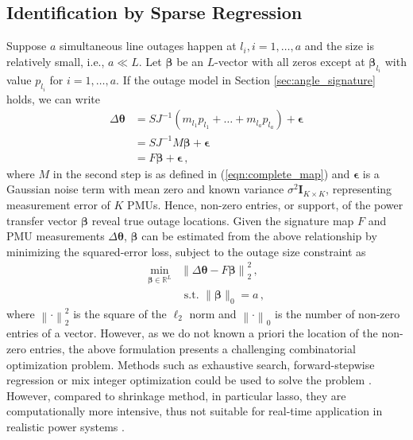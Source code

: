 \subsection{Identification by Sparse Regression}
\label{sec:sparse_regression}
Suppose $a$ simultaneous line outages happen at $l_i, i=1, \dots, a$ and the size is relatively small, i.e., $a \ll L$. Let $\boldsymbol{\beta}$ be an $L$-vector with all zeros except at $\boldsymbol{\beta}_{l_i}$ with value $p_{l_i}$ for $i = 1, \dots, a$.
If the outage model in Section \ref{sec:angle_signature} holds, we can write
\begin{align}
    \Delta\boldsymbol{\theta} &= S J^{-1} (m_{l_1} p_{l_1} + \dots + m_{l_a} p_{l_a}) + \boldsymbol{\epsilon} \nonumber\\
    &= S J^{-1} M \boldsymbol{\beta} + \boldsymbol{\epsilon} \nonumber\\
    &= F \boldsymbol{\beta} + \boldsymbol{\epsilon}  \,,
\end{align}
where $M$ in the second step is as defined in (\ref{eqn:complete_map}) and $\boldsymbol{\epsilon}$ is a Gaussian noise term with mean zero and known variance $\sigma^2 \textbf{I}_{K\times K}$, representing measurement error of $K$ PMUs. Hence, non-zero entries, or support, of the power transfer vector $\boldsymbol{\beta}$ reveal true outage locations. Given the signature map $F$ and PMU measurements $\Delta\boldsymbol{\theta}$, $\boldsymbol{\beta}$ can be estimated from the above relationship by minimizing the squared-error loss, subject to the outage size constraint as
\begin{align}
\label{eqn:l_0_formulation}
\underset{\boldsymbol{\beta} \in \mathbb{R}^{L}}{\min} &\left\|\Delta\boldsymbol{\theta} - F\boldsymbol{\beta}\right\|_{2}^{2} \,, \\
& \text { s.t. }\|\boldsymbol{\beta}\|_{0} = a \nonumber\,,
\end{align}
where $\left\|\cdot\right\|^2_2$ is the square of the $\ell_2$ norm and $\left\|\cdot\right\|_0$ is the number of non-zero entries of a vector. However, as we do not known a priori the location of the non-zero entries, the above formulation presents a challenging combinatorial optimization problem. Methods such as exhaustive search, forward-stepwise regression or mix integer optimization could be used to solve the problem \cite{bertsimas2020sparse}. However, compared to shrinkage method, in particular lasso, they are computationally more intensive, thus not suitable for real-time application in realistic power systems \cite{hastie2020best}. 

